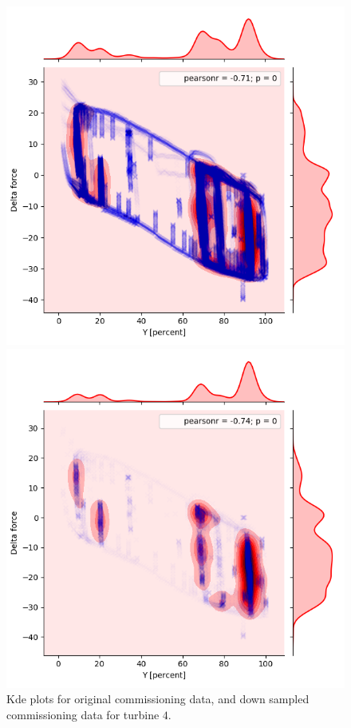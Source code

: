             \begin{figure}[h]
                \begin{minipage}[b]{0.5\linewidth}
                    \includegraphics[width=1\linewidth]{figures/data/kdePlot_noServo_A4.png} 
                \end{minipage}
                  \hfill
                  \begin{minipage}[b]{0.5\linewidth}
                    \includegraphics[width=1\linewidth]{figures/data/kdePlot_reduced_noServo_A4.png} 
                \end{minipage} 
                \caption{Kde plots for original commissioning data, and down sampled commissioning data for turbine $4$.}
                \label{fig:downsample}
            \end{figure}
        
